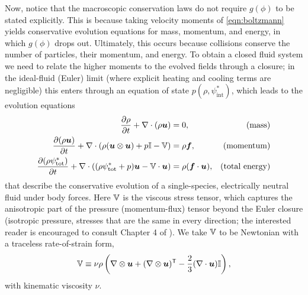 Now, notice that the macroscopic conservation laws do not require $g(\phi)$ to be stated explicitly. This is because taking velocity moments of \autoref{eqn:boltzmann} yields conservative evolution equations for mass, momentum, and energy, in which $g(\phi)$ drops out. Ultimately, this occurs because collisions conserve the number of particles, their momentum, and energy. To obtain a closed fluid system we need to relate the higher moments to the evolved fields through a closure; in the ideal-fluid (Euler) limit (where explicit heating and cooling terms are negligible) this enters through an equation of state $p(\rho, \psi^{*}_\mathrm{int})$, which leads to the evolution equations
\begin{align}
    \frac{\partial \rho}{\partial t}
        + \nabla \cdot (\rho \bm{u})
        &= 0
        , & \mbox{(mass)} \label{eqn:fluid:mass} \\
    \frac{\partial (\rho \bm{u})}{\partial t}
        + \nabla \cdot \left( 
            \rho (\bm{u}\otimes\bm{u})
            + p \mathbb{I}
            - \mathbb{V}
         \right)
        &= \rho \bm{f}
        , & \mbox{(momentum)} \label{eqn:fluid:momentum} \\
    \frac{\partial (\rho \psi^{*}_\mathrm{tot})}{\partial t}
        + \nabla \cdot \left( 
            (\rho \psi^{*}_\mathrm{tot} + p) \bm{u}
            - \mathbb{V} \cdot \bm{u}
         \right)
        &= \rho (\bm{f}\cdot\bm{u})
        , & \mbox{(total energy)} \label{eqn:fluid:energy}
\end{align}
that describe the conservative evolution of a single-species, electrically neutral fluid under body forces. Here $\mathbb{V}$ is the viscous stress tensor, which captures the anisotropic part of the pressure (momentum-flux) tensor beyond the Euler closure (isotropic pressure, \ie stresses that are the same in every direction; the interested reader is encouraged to consult Chapter 4 of \citealt{shu2010physics}). We take $\mathbb{V}$ to be Newtonian with a traceless rate-of-strain form,
\begin{align}
    \mathbb{V}
        \equiv \nu \rho \left( 
            \nabla\otimes\bm{u} + (\nabla\otimes\bm{u})^\mathsf{T}
            - \frac{2}{3}(\nabla\cdot\bm{u}) \mathbb{I}
         \right)
    , \label{eqn:fluid:viscosity}
\end{align}
with kinematic viscosity $\nu$.

